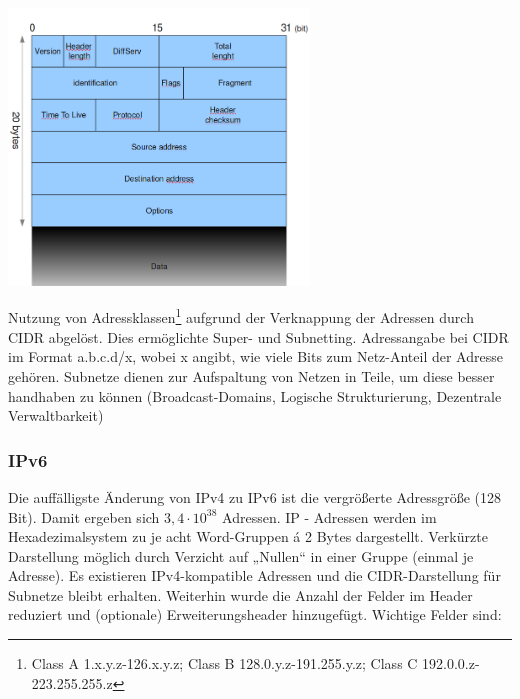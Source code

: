 \documentclass{article} %
\begin{document}
\begin{center}
\includegraphics[width=8cm]{img/IP_packet}
\end{center}

Nutzung von Adressklassen\footnote{Class A 1.x.y.z-126.x.y.z; Class B 128.0.y.z-191.255.y.z; Class C 192.0.0.z-223.255.255.z} aufgrund der Verknappung der Adressen durch CIDR\cite{rfc1519} abgelöst.
Dies ermöglichte Super- und Subnetting.
Adressangabe bei CIDR im Format a.b.c.d/x, wobei x angibt, wie viele Bits zum Netz-Anteil der Adresse gehören.
Subnetze dienen zur Aufspaltung von Netzen in Teile, um diese besser handhaben zu können (Broadcast-Domains, Logische Strukturierung, Dezentrale Verwaltbarkeit)
\subsubsection{IPv6}

Die auffälligste Änderung von IPv4 zu IPv6 ist die vergrößerte Adressgröße (128 Bit).
Damit ergeben sich $3,4 \cdot 10^{38}$ Adressen.
IP - Adressen werden im Hexadezimalsystem zu je acht Word-Gruppen á 2 Bytes dargestellt.
Verkürzte Darstellung möglich durch Verzicht auf „Nullen“ in einer Gruppe (einmal je Adresse).
Es existieren IPv4-kompatible Adressen und die CIDR-Darstellung für Subnetze bleibt erhalten.
Weiterhin wurde die Anzahl der Felder im Header reduziert und (optionale) Erweiterungsheader hinzugefügt.
Wichtige Felder sind:
\end{document}
